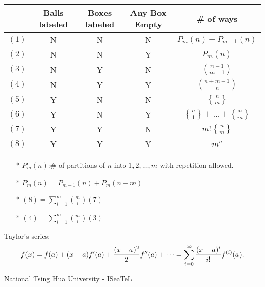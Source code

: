 \documentclass[a4paper]{amsart}
\newcommand{\stirlingsecond}[2]{\genfrac{\{}{\}}{0pt}{}{#1}{#2}}
\begin{document}
      \begin{tabular}{|c|c|c|c|c|}
        \hline
         & Balls labeled & Boxes labeled & Any Box Empty & \# of ways \\ \hline
        $(1)$ & N & N & N & $P_m(n)-P_{m-1}(n)$ \\ \hline
        $(2)$ & N & N & Y & $P_m(n)$ \\ \hline
        $(3)$ & N & Y & N & $\binom{n-1}{m-1}$ \\ \hline
        $(4)$ & N & Y & Y & $\binom{n+m-1}{n}$ \\ \hline
        $(5)$ & Y & N & N & $\stirlingsecond{n}{m}$ \\ \hline
        $(6)$ & Y & N & Y & $\stirlingsecond{n}{1}+...+\stirlingsecond{n}{m}$ \\ \hline
        $(7)$ & Y & Y & N & $m!\stirlingsecond{n}{m}$ \\ \hline
        $(8)$ & Y & Y & Y & $m^n$ \\ \hline
      \end{tabular}
    \begin{enumerate}
    \item[*] $P_m(n)$:\# of partitions of $n$ into $1,2,...,m$ with repetition allowed.
    \item[*] $P_m(n)=P_{m-1}(n)+P_{m}(n-m)$
    \item[*] $(8)=\sum^m_{i=1}\binom{m}{i}(7)$
    \item[*] $(4)=\sum^m_{i=1}\binom{m}{i}(3)$
    \end{enumerate}
    Taylor's series:
$$
f(x) = f(a) + (x-a)f'(a) + {(x-a)^2 \over 2} f''(a) + \cdots = \sum_{i=0}^\infty {(x-a)^i \over i!} f^{(i)}(a).
$$




  \enlargethispage*{\baselineskip}
  \pagebreak

  \begin{center}

    \vspace{0.35cm}

    \huge National Tsing Hua University - ISeaTeL

    \vspace{0.35cm}

  \end{center}
\end{document}

